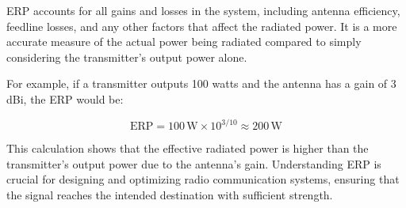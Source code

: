 ERP accounts for all gains and losses in the system, including antenna efficiency, feedline losses, and any other factors that affect the radiated power. It is a more accurate measure of the actual power being radiated compared to simply considering the transmitter’s output power alone.

For example, if a transmitter outputs 100 watts and the antenna has a gain of 3 dBi, the ERP would be:

\[
\text{ERP} = 100 \, \text{W} \times 10^{3/10} \approx 200 \, \text{W}
\]

This calculation shows that the effective radiated power is higher than the transmitter’s output power due to the antenna’s gain. Understanding ERP is crucial for designing and optimizing radio communication systems, ensuring that the signal reaches the intended destination with sufficient strength.

